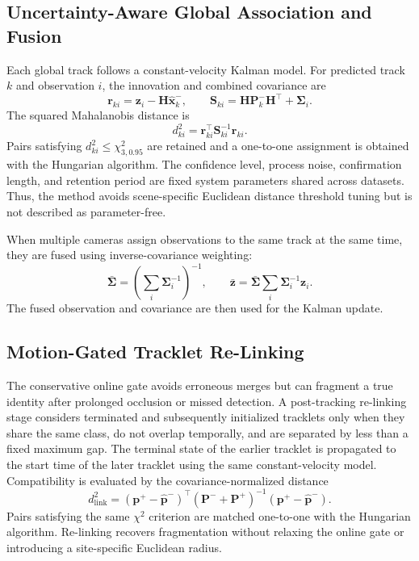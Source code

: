 \subsection{Uncertainty-Aware Global Association and Fusion}
Each global track follows a constant-velocity Kalman model. For predicted track $k$ and observation $i$, the innovation and combined covariance are
\begin{equation}
\mathbf{r}_{ki}=\mathbf{z}_i-\mathbf{H}\hat{\mathbf{x}}_k^{-},\qquad
\mathbf{S}_{ki}=\mathbf{H}\mathbf{P}_k^{-}\mathbf{H}^{\top}+\boldsymbol{\Sigma}_i.
\end{equation}
The squared Mahalanobis distance is
\begin{equation}
d_{ki}^{2}=\mathbf{r}_{ki}^{\top}\mathbf{S}_{ki}^{-1}\mathbf{r}_{ki}.
\end{equation}
Pairs satisfying $d_{ki}^{2}\leq\chi^2_{3,0.95}$ are retained and a one-to-one assignment is obtained with the Hungarian algorithm. The confidence level, process noise, confirmation length, and retention period are fixed system parameters shared across datasets. Thus, the method avoids scene-specific Euclidean distance threshold tuning but is not described as parameter-free.

When multiple cameras assign observations to the same track at the same time, they are fused using inverse-covariance weighting:
\begin{equation}
\bar{\boldsymbol{\Sigma}}=\left(\sum_i\boldsymbol{\Sigma}_i^{-1}\right)^{-1},\qquad
\bar{\mathbf{z}}=\bar{\boldsymbol{\Sigma}}\sum_i\boldsymbol{\Sigma}_i^{-1}\mathbf{z}_i.
\end{equation}
The fused observation and covariance are then used for the Kalman update.

\subsection{Motion-Gated Tracklet Re-Linking}
The conservative online gate avoids erroneous merges but can fragment a true identity after prolonged occlusion or missed detection. A post-tracking re-linking stage considers terminated and subsequently initialized tracklets only when they share the same class, do not overlap temporally, and are separated by less than a fixed maximum gap. The terminal state of the earlier tracklet is propagated to the start time of the later tracklet using the same constant-velocity model. Compatibility is evaluated by the covariance-normalized distance
\begin{equation}
d_{\mathrm{link}}^2=(\mathbf{p}^{+}-\hat{\mathbf{p}}^{-})^{\top}(\mathbf{P}^{-}+\mathbf{P}^{+})^{-1}(\mathbf{p}^{+}-\hat{\mathbf{p}}^{-}).
\end{equation}
Pairs satisfying the same $\chi^2$ criterion are matched one-to-one with the Hungarian algorithm. Re-linking recovers fragmentation without relaxing the online gate or introducing a site-specific Euclidean radius.

